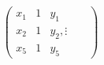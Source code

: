 \documentclass[preview]{standalone}
\begin{document}
\begin{align*}
\left(\begin{array}{cc|c} x_1 & 1 & y_1 \\ x_2 & 1 & y_2, \vdots & & \\ x_5 & 1 & y_5 \end{array}\right)
\end{align*}
\end{document}
